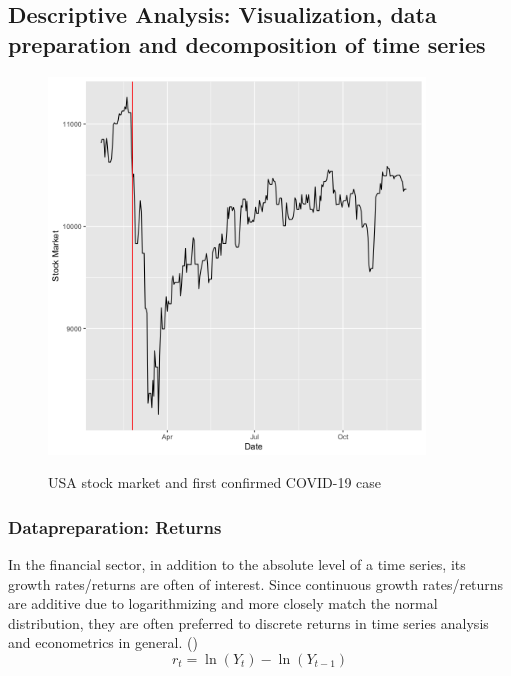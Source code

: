 \documentclass[11pt]{article}
\begin{document}
\subsection{Descriptive Analysis: Visualization, data preparation and decomposition of time series}

\begin{figure}[!htb]
\centering
\includegraphics[width=100mm]{R-Code/plots/switzerlandFinance.png} \\
\caption{USA stock market and first confirmed COVID-19 case}
\end{figure}




\subsubsection{Datapreparation: Returns}
In the financial sector, in addition to the absolute level of a time series, its growth rates/returns are often of interest.
Since continuous growth rates/returns are additive due to logarithmizing and more closely match the normal distribution, they are often preferred to discrete returns in time series analysis and econometrics in general. (\cite{PowerPoi49:online})
$$r_{t} =\ln \left(Y_{t}\right)-\ln \left(Y_{t-1}\right)$$
\end{document}
